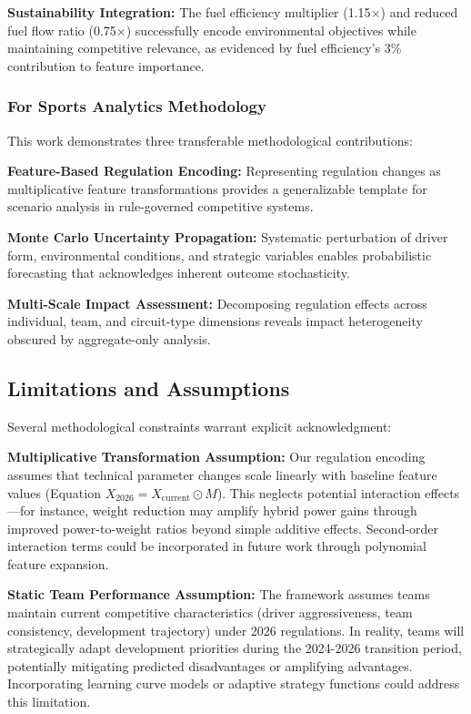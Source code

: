 \documentclass[conference]{IEEEtran}
\begin{document}
\textbf{Sustainability Integration:} The fuel efficiency multiplier (1.15$\times$) and reduced fuel flow ratio (0.75$\times$) successfully encode environmental objectives while maintaining competitive relevance, as evidenced by fuel efficiency's 3\% contribution to feature importance.

\subsubsection{For Sports Analytics Methodology}

This work demonstrates three transferable methodological contributions:

\textbf{Feature-Based Regulation Encoding:} Representing regulation changes as multiplicative feature transformations provides a generalizable template for scenario analysis in rule-governed competitive systems.

\textbf{Monte Carlo Uncertainty Propagation:} Systematic perturbation of driver form, environmental conditions, and strategic variables enables probabilistic forecasting that acknowledges inherent outcome stochasticity.

\textbf{Multi-Scale Impact Assessment:} Decomposing regulation effects across individual, team, and circuit-type dimensions reveals impact heterogeneity obscured by aggregate-only analysis.

\subsection{Limitations and Assumptions}

Several methodological constraints warrant explicit acknowledgment:

\textbf{Multiplicative Transformation Assumption:} Our regulation encoding assumes that technical parameter changes scale linearly with baseline feature values (Equation $X_{\text{2026}} = X_{\text{current}} \odot M$). This neglects potential interaction effects—for instance, weight reduction may amplify hybrid power gains through improved power-to-weight ratios beyond simple additive effects. Second-order interaction terms could be incorporated in future work through polynomial feature expansion.

\textbf{Static Team Performance Assumption:} The framework assumes teams maintain current competitive characteristics (driver aggressiveness, team consistency, development trajectory) under 2026 regulations. In reality, teams will strategically adapt development priorities during the 2024-2026 transition period, potentially mitigating predicted disadvantages or amplifying advantages. Incorporating learning curve models or adaptive strategy functions could address this limitation.
\end{document}
